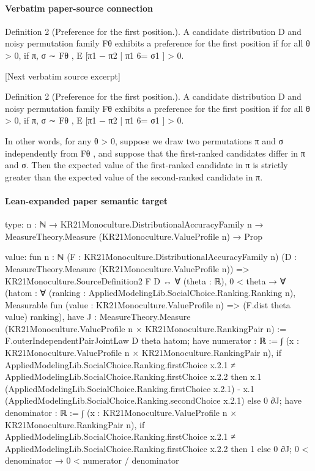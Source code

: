 \documentclass[10pt]{article}
\begin{document}
\paragraph{Verbatim paper-source connection}
\begin{ReviewVerbatim}
Definition 2 (Preference for the first position.). A candidate distribution D and noisy permutation family
Fθ exhibits a preference for the first position if for all θ > 0, if π, σ ∼ Fθ ,
E [π1 − π2 | π1 6= σ1 ] > 0.

[Next verbatim source excerpt]

Definition 2 (Preference for the first position.). A candidate distribution D and noisy permutation family
Fθ exhibits a preference for the first position if for all θ > 0, if π, σ ∼ Fθ ,
E [π1 − π2 | π1 6= σ1 ] > 0.

In other words, for any θ > 0, suppose we draw two permutations π and σ independently from Fθ , and
suppose that the first-ranked candidates differ in π and σ. Then the expected value of the first-ranked
candidate in π is strictly greater than the expected value of the second-ranked candidate in π.
\end{ReviewVerbatim}



\paragraph{Lean-expanded paper semantic target}
\begin{ReviewVerbatim}
type:
{n : ℕ} → KR21Monoculture.DistributionalAccuracyFamily n → MeasureTheory.Measure (KR21Monoculture.ValueProfile n) → Prop

value:
fun {n : ℕ} (F : KR21Monoculture.DistributionalAccuracyFamily n)
    (D : MeasureTheory.Measure (KR21Monoculture.ValueProfile n)) =>
  KR21Monoculture.SourceDefinition2 F D ↔
    ∀ (theta : ℝ),
      0 < theta →
        ∀
          (hatom :
            ∀ (ranking : AppliedModelingLib.SocialChoice.Ranking.Ranking n),
              Measurable fun (value : KR21Monoculture.ValueProfile n) => (F.dist theta value) ranking),
          have J : MeasureTheory.Measure (KR21Monoculture.ValueProfile n × KR21Monoculture.RankingPair n) :=
            F.outerIndependentPairJointLaw D theta hatom;
          have numerator : ℝ :=
            ∫ (x : KR21Monoculture.ValueProfile n × KR21Monoculture.RankingPair n),
              if
                  AppliedModelingLib.SocialChoice.Ranking.firstChoice x.2.1 ≠
                    AppliedModelingLib.SocialChoice.Ranking.firstChoice x.2.2 then
                x.1 (AppliedModelingLib.SocialChoice.Ranking.firstChoice x.2.1) -
                  x.1 (AppliedModelingLib.SocialChoice.Ranking.secondChoice x.2.1)
              else 0 ∂J;
          have denominator : ℝ :=
            ∫ (x : KR21Monoculture.ValueProfile n × KR21Monoculture.RankingPair n),
              if
                  AppliedModelingLib.SocialChoice.Ranking.firstChoice x.2.1 ≠
                    AppliedModelingLib.SocialChoice.Ranking.firstChoice x.2.2 then
                1
              else 0 ∂J;
          0 < denominator → 0 < numerator / denominator
\end{ReviewVerbatim}
\end{document}
